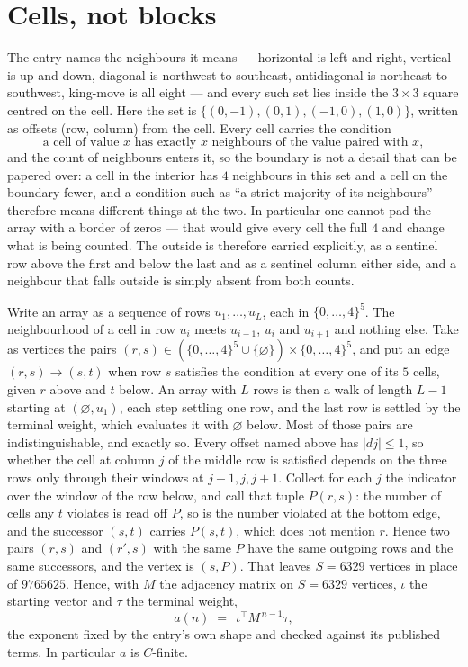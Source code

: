 \documentclass[11pt,a4paper]{article}
\theoremstyle{plain}
\theoremstyle{definition}
\begin{document}
\section{Cells, not blocks}

The entry names the neighbours it means --- horizontal is left and right, vertical is up and
down, diagonal is northwest-to-southeast, antidiagonal is northeast-to-southwest, king-move is
all eight --- and every such set lies inside the $3\times3$ square centred on the cell. Here
the set is $\{(0,-1), (0,1), (-1,0), (1,0)\}$, written as offsets (row, column) from the cell. Every cell carries
the condition
\[
\text{a cell of value }x\text{ has exactly }x\text{ neighbours of the value paired with }x,
\]
and the count of neighbours enters it, so the boundary is not a detail that can be papered
over: a cell in the interior has $4$ neighbours in this set and a cell on the boundary
fewer, and a condition such as ``a strict majority of its neighbours'' therefore means
different things at the two. In particular one cannot pad the array with a border of zeros ---
that would give every cell the full $4$ and change what is being counted. The outside is
therefore carried
explicitly, as a sentinel row above the first and below the last and as a sentinel column
either side, and a neighbour that falls outside is simply absent from both counts.

Write an array as a sequence of rows $u_1,\dots,u_L$, each in
$\{0,\dots,4\}^{5}$. The neighbourhood of a cell in row $u_i$ meets $u_{i-1}$,
$u_i$ and $u_{i+1}$ and nothing else. Take as vertices the pairs
$(r,s)\in(\{0,\dots,4\}^{5}\cup\{\varnothing\})\times\{0,\dots,4\}^{5}$,
and put an edge $(r,s)\to(s,t)$ when row $s$ satisfies the condition at every one of its
$5$ cells, given $r$ above and $t$ below. An array with $L$ rows is then a walk of length
$L-1$ starting at $(\varnothing,u_1)$, each step settling one row, and the last row is
settled by the terminal weight, which evaluates it with $\varnothing$ below. Most of those pairs are indistinguishable, and exactly so. Every offset named above has $|dj|\le 1$, so whether the cell at column $j$ of the middle row is satisfied depends on the three rows only through their windows at $j-1,j,j+1$. Collect for each $j$ the indicator over the window of the row below, and call that tuple $P(r,s)$: the number of cells any $t$ violates is read off $P$, so is the number violated at the bottom edge, and the successor $(s,t)$ carries $P(s,t)$, which does not mention $r$. Hence two pairs $(r,s)$ and $(r',s)$ with the same $P$ have the same outgoing rows and the same successors, and the vertex is $(s,P)$. That leaves $S=6329$ vertices in place of $9765625$. Hence,
with $M$ the adjacency matrix on $S=6329$ vertices, $\iota$ the starting vector and $\tau$ the
terminal weight,
\[
a(n)\;=\;\,\iota^{\!\top}M^{\,n-1}\tau ,
\]
the exponent fixed by the entry's own shape and checked against its published terms. In
particular $a$ is $C$-finite.
\end{document}
